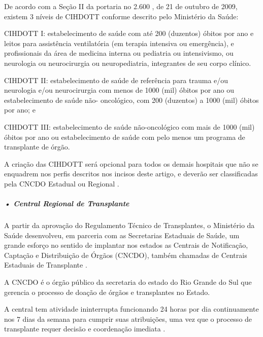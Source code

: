 \documentclass[portuguese,oneside]{tcc}
\begin{document}
De acordo com a Seção II da portaria no 2.600 \cite{PORTARIA}, de 21 de outubro de 2009, existem 3 níveis de CIHDOTT conforme descrito pelo Ministério da Saúde:

CIHDOTT I: estabelecimento de saúde com até 200 (duzentos) óbitos por ano e leitos para assistência ventilatória (em terapia intensiva ou emergência), e profissionais da área de medicina interna ou pediatria ou intensivismo, ou neurologia ou neurocirurgia ou neuropediatria, integrantes de seu corpo clínico.

CIHDOTT II: estabelecimento de saúde de referência para trauma e/ou neurologia e/ou neurocirurgia com menos de 1000 (mil) óbitos por ano ou estabelecimento de saúde não-
oncológico, com 200 (duzentos) a 1000 (mil) óbitos por ano; e

CIHDOTT III: estabelecimento de saúde não-oncológico com mais de 1000 (mil) óbitos por ano ou estabelecimento de saúde com pelo menos um programa de transplante de órgão.

A criação das CIHDOTT será opcional para todos os demais hospitais que não se enquadrem nos perfis descritos nos incisos deste artigo, e deverão ser classificadas pela CNCDO Estadual ou Regional \cite{BVSMS}.


\subparagraph{• Central Regional de Transplante}
A partir da aprovação do Regulamento Técnico de Transplantes, o Ministério da Saúde desenvolveu, em parceria com as Secretarias Estaduais de Saúde, um grande esforço no sentido de implantar nos estados as Centrais de Notificação, Captação e Distribuição de Órgãos (CNCDO), também chamadas de Centrais Estaduais de Transplante \cite{SEST}. 

A CNCDO é o órgão público da secretaria do estado do Rio Grande do Sul que gerencia o processo de doação de órgãos e transplantes no Estado.

A central tem atividade ininterrupta funcionando 24 horas por dia continuamente nos 7 dias da semana para cumprir suas atribuições, uma vez que o processo de transplante requer decisão e coordenação imediata \cite{SCSCT}.
\end{document}
